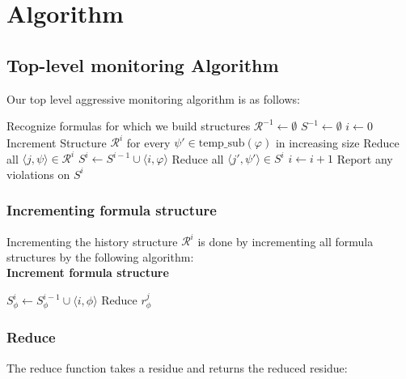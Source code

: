 \documentclass[10pt,a4paper]{article}
\newcommand{\rp}[2]{\ensuremath{\langle #1, #2 \rangle}}
\newcommand{\res}[2]{\ensuremath{r_{#1}^{#2}}}
\begin{document}
\newpage
\section{Algorithm}
\subsection{Top-level monitoring Algorithm}
Our top level aggressive monitoring algorithm is as follows:


\begin{algorithmic}[1]
\STATE Recognize formulas for which we build structures
\STATE $\mathcal{R}^{-1} \leftarrow \emptyset$
\STATE $S^{-1} \leftarrow \emptyset$
\STATE $i \leftarrow 0$
\LOOP
\STATE Increment Structure $\mathcal{R}^{i}$ for every $\psi' \in \text{temp\_sub}(\varphi)$ in increasing size
\STATE Reduce all $\rp{j}{\psi} \in \mathcal{R}^i$
\STATE $S^i \leftarrow S^{i-1} \cup \rp{i}{\varphi}$
\STATE Reduce all $\rp{j'}{\psi'} \in S^i$
\STATE $i \leftarrow i + 1$
\STATE Report any violations on $S^i$
\ENDLOOP
\end{algorithmic}


\subsubsection*{Incrementing formula structure}
Incrementing the history structure $\mathcal{R}^i$ is done by incrementing all formula structures by the following algorithm:
\\

\noindent \textbf{Increment formula structure}
\begin{algorithmic}[1]
\STATE ${S_{\phi}^{i}} \leftarrow S_{\phi}^{i-1} \cup \rp{i}{\phi}$
\FOR{all $\res{\phi}{j} \in {S_{\phi}^{i}}$}
\STATE Reduce $\res{\phi}{j}$
\ENDFOR
\end{algorithmic}

\newpage
\subsubsection*{Reduce}
The reduce function takes a residue and returns the reduced residue:
\end{document}
